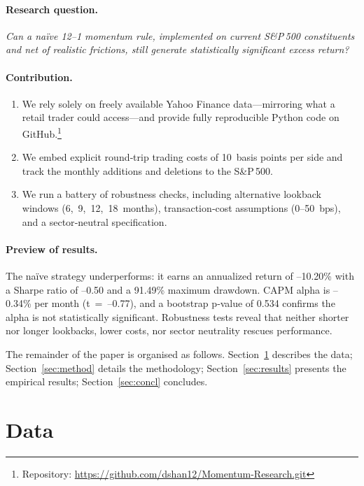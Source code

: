 \documentclass[11pt]{article}
\begin{document}
\paragraph{Research question.}
\emph{Can a naïve 12--1 momentum rule, implemented on current S\&P\,500 constituents and net of realistic frictions, still generate statistically significant excess return?}

\paragraph{Contribution.}
\begin{enumerate}[label=(\roman*)]
  \item We rely solely on freely available Yahoo Finance data—mirroring what a retail trader could access—and provide fully reproducible Python code on GitHub.\footnote{Repository: \url{https://github.com/dshan12/Momentum-Research.git}}
  \item We embed explicit round‑trip trading costs of 10~basis points per side and track the monthly additions and deletions to the S\&P\,500.
  \item We run a battery of robustness checks, including alternative lookback windows (6, 9, 12, 18 months), transaction‐cost assumptions (0–50 bps), and a sector‑neutral specification.
\end{enumerate}

\paragraph{Preview of results.}
The naïve strategy underperforms: it earns an annualized return of --10.20\% with a Sharpe ratio of --0.50 and a 91.49\% maximum drawdown.  CAPM alpha is --0.34\% per month (t~=~--0.77), and a bootstrap p‑value of 0.534 confirms the alpha is not statistically significant.  Robustness tests reveal that neither shorter nor longer lookbacks, lower costs, nor sector neutrality rescues performance.

The remainder of the paper is organised as follows.  Section~\ref{sec:data} describes the data; Section~\ref{sec:method} details the methodology; Section~\ref{sec:results} presents the empirical results; Section~\ref{sec:concl} concludes.

\section{Data} \label{sec:data}
\end{document}
